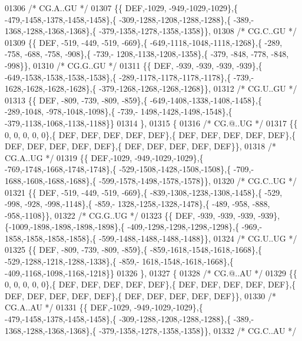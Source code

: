 \begin{DoxyCode}
01306 \textcolor{comment}{/* CG.A..GU */}
01307 \{\{  DEF,-1029, -949,-1029,-1029\},\{ -479,-1458,-1378,-1458,-1458\},\{ -309,-1288,-1208,-1288,-1288\},\{ -389,-
      1368,-1288,-1368,-1368\},\{ -379,-1358,-1278,-1358,-1358\}\},
01308 \textcolor{comment}{/* CG.C..GU */}
01309 \{\{  DEF, -519, -449, -519, -669\},\{ -649,-1118,-1048,-1118,-1268\},\{ -289, -758, -688, -758, -908\},\{ -739,-
      1208,-1138,-1208,-1358\},\{ -379, -848, -778, -848, -998\}\},
01310 \textcolor{comment}{/* CG.G..GU */}
01311 \{\{  DEF, -939, -939, -939, -939\},\{ -649,-1538,-1538,-1538,-1538\},\{ -289,-1178,-1178,-1178,-1178\},\{ -739,-
      1628,-1628,-1628,-1628\},\{ -379,-1268,-1268,-1268,-1268\}\},
01312 \textcolor{comment}{/* CG.U..GU */}
01313 \{\{  DEF, -809, -739, -809, -859\},\{ -649,-1408,-1338,-1408,-1458\},\{ -289,-1048, -978,-1048,-1098\},\{ -739,-
      1498,-1428,-1498,-1548\},\{ -379,-1138,-1068,-1138,-1188\}\}
01314 \},
01315 \{
01316 \textcolor{comment}{/* CG.@..UG */}
01317 \{\{    0,    0,    0,    0,    0\},\{  DEF,  DEF,  DEF,  DEF,  DEF\},\{  DEF,  DEF,  DEF,  DEF,  DEF\},\{  DEF,  
      DEF,  DEF,  DEF,  DEF\},\{  DEF,  DEF,  DEF,  DEF,  DEF\}\},
01318 \textcolor{comment}{/* CG.A..UG */}
01319 \{\{  DEF,-1029, -949,-1029,-1029\},\{ -769,-1748,-1668,-1748,-1748\},\{ -529,-1508,-1428,-1508,-1508\},\{ -709,-
      1688,-1608,-1688,-1688\},\{ -599,-1578,-1498,-1578,-1578\}\},
01320 \textcolor{comment}{/* CG.C..UG */}
01321 \{\{  DEF, -519, -449, -519, -669\},\{ -839,-1308,-1238,-1308,-1458\},\{ -529, -998, -928, -998,-1148\},\{ -859,-
      1328,-1258,-1328,-1478\},\{ -489, -958, -888, -958,-1108\}\},
01322 \textcolor{comment}{/* CG.G..UG */}
01323 \{\{  DEF, -939, -939, -939, -939\},\{-1009,-1898,-1898,-1898,-1898\},\{ -409,-1298,-1298,-1298,-1298\},\{ -969,-
      1858,-1858,-1858,-1858\},\{ -599,-1488,-1488,-1488,-1488\}\},
01324 \textcolor{comment}{/* CG.U..UG */}
01325 \{\{  DEF, -809, -739, -809, -859\},\{ -859,-1618,-1548,-1618,-1668\},\{ -529,-1288,-1218,-1288,-1338\},\{ -859,-
      1618,-1548,-1618,-1668\},\{ -409,-1168,-1098,-1168,-1218\}\}
01326 \},
01327 \{
01328 \textcolor{comment}{/* CG.@..AU */}
01329 \{\{    0,    0,    0,    0,    0\},\{  DEF,  DEF,  DEF,  DEF,  DEF\},\{  DEF,  DEF,  DEF,  DEF,  DEF\},\{  DEF,  
      DEF,  DEF,  DEF,  DEF\},\{  DEF,  DEF,  DEF,  DEF,  DEF\}\},
01330 \textcolor{comment}{/* CG.A..AU */}
01331 \{\{  DEF,-1029, -949,-1029,-1029\},\{ -479,-1458,-1378,-1458,-1458\},\{ -309,-1288,-1208,-1288,-1288\},\{ -389,-
      1368,-1288,-1368,-1368\},\{ -379,-1358,-1278,-1358,-1358\}\},
01332 \textcolor{comment}{/* CG.C..AU */}

\end{DoxyCode}
